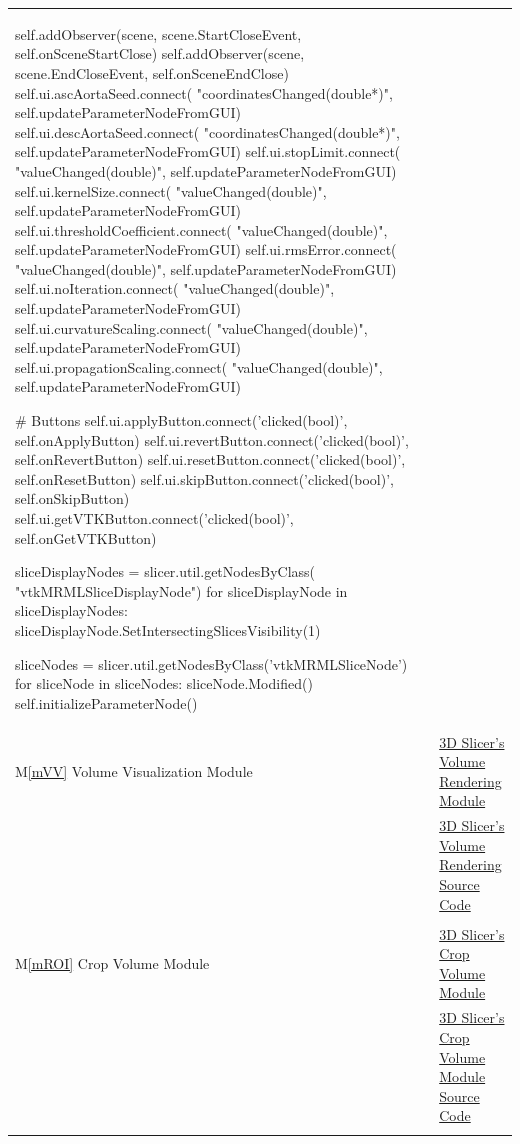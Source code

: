 \documentclass[12pt, titlepage]{article}
\newcommand{\mref}[1]{M\ref{#1}}
\begin{document}
\begin{longtable}[H]{p{} p{} p{}}
\begin{python}
        self.addObserver(scene, scene.StartCloseEvent, self.onSceneStartClose)
        self.addObserver(scene, scene.EndCloseEvent, self.onSceneEndClose)
        self.ui.ascAortaSeed.connect(
            "coordinatesChanged(double*)", self.updateParameterNodeFromGUI)
        self.ui.descAortaSeed.connect(
            "coordinatesChanged(double*)", self.updateParameterNodeFromGUI)
        self.ui.stopLimit.connect(
            "valueChanged(double)", self.updateParameterNodeFromGUI)
        self.ui.kernelSize.connect(
            "valueChanged(double)", self.updateParameterNodeFromGUI)
        self.ui.thresholdCoefficient.connect(
            "valueChanged(double)", self.updateParameterNodeFromGUI)
        self.ui.rmsError.connect(
            "valueChanged(double)", self.updateParameterNodeFromGUI)
        self.ui.noIteration.connect(
            "valueChanged(double)", self.updateParameterNodeFromGUI)
        self.ui.curvatureScaling.connect(
            "valueChanged(double)", self.updateParameterNodeFromGUI)
        self.ui.propagationScaling.connect(
            "valueChanged(double)", self.updateParameterNodeFromGUI)

        # Buttons
        self.ui.applyButton.connect('clicked(bool)', self.onApplyButton)
        self.ui.revertButton.connect('clicked(bool)', self.onRevertButton)
        self.ui.resetButton.connect('clicked(bool)', self.onResetButton)
        self.ui.skipButton.connect('clicked(bool)', self.onSkipButton)
        self.ui.getVTKButton.connect('clicked(bool)', self.onGetVTKButton)

        sliceDisplayNodes = slicer.util.getNodesByClass(
            "vtkMRMLSliceDisplayNode")
        for sliceDisplayNode in sliceDisplayNodes:
            sliceDisplayNode.SetIntersectingSlicesVisibility(1)

        sliceNodes = slicer.util.getNodesByClass('vtkMRMLSliceNode')
        for sliceNode in sliceNodes:
            sliceNode.Modified()
        self.initializeParameterNode()
\end{python}
\\
\multicolumn{2}{p{0.2\textwidth}}{\mref{mVV} Volume Visualization Module} & {\href{https://slicer.readthedocs.io/en/latest/user_guide/modules/volumerendering.html}{3D Slicer's Volume Rendering Module}} \\
\multicolumn{2}{p{0.2\textwidth}}{} & {\href{https://github.com/Slicer/Slicer/blob/main/Modules/Loadable/VolumeRendering/Logic/vtkSlicerVolumeRenderingLogic.h}{3D Slicer's Volume Rendering Source Code}} \\ \\
\multicolumn{2}{p{0.2\textwidth}}{\mref{mROI} Crop Volume Module} &  {\href{https://slicer.readthedocs.io/en/latest/user_guide/modules/cropvolume.html}{3D Slicer's Crop Volume Module}} \\
\multicolumn{2}{p{0.2\textwidth}}{} &
{\href{https://github.com/Slicer/Slicer/blob/main/Modules/Loadable/CropVolume/Logic/vtkSlicerCropVolumeLogic.h}{3D Slicer's Crop Volume Module Source Code}}\\ \\


\end{longtable}
\end{document}
